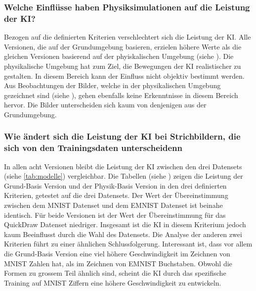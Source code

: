 \subsubsection*{Welche Einflüsse haben Physiksimulationen auf die Leistung der KI?}\label{subsub:d_frage_unter_4}
Bezogen auf die definierten Kriterien verschlechtert sich die Leistung der KI.
Alle Versionen, die auf der Grundumgebung basieren, erzielen höhere Werte als
die gleichen Versionen basierend auf der phyiskalischen Umgebung (siehe
). Die physikalische Umgebung hat zum Ziel, die
Bewegungen der KI realistischer zu gestalten. In diesem Bereich kann der
Einfluss nicht objektiv bestimmt werden. Aus Beobachtungen der Bilder, welche in
der physikalischen Umgebung gezeichnet sind (siehe ), gehen
ebenfalls keine Erkenntnisse in diesem Bereich hervor. Die Bilder unterscheiden
sich kaum von denjenigen aus der Grundumgebung.

\subsubsection*{Wie ändert sich die Leistung der KI bei Strichbildern, die sich
von den Trainingsdaten unterscheidenn}\label{subsub:d_frage_unter_5} In allen
acht Versionen bleibt die Leistung der KI zwischen den drei Datensets (siehe
\autoref{tab:modelle}) vergleichbar. Die Tabellen (siehe )
zeigen die Leistung der Grund-Basis Version und der Physik-Basis Version in den
drei definierten Kriterien, getestet auf die drei Datensets. Der Wert der
Übereinstimmung zwischen dem MNIST Datenset und dem EMNIST Datenset ist beinahe
identisch. Für beide Versionen ist der Wert der Übereinstimmung für das
QuickDraw Datenset niedriger. Insgesamt ist die KI in diesem Kriterium jedoch
kaum Beeinflusst durch die Wahl des Datensets. Die Analyse der anderen zwei
Kriterien führt zu einer ähnlichen Schlussfolgerung. Interessant ist, dass vor
allem die Grund-Basis Version eine viel höhere Geschwindigkeit im Zeichnen von
MNIST Zahlen hat, als im Zeichnen von EMNIST Buchstaben. Obwohl die Formen zu
grossem Teil ähnlich sind, scheint die KI durch das spezifische Training auf
MNIST Ziffern eine höhere Geschwindigkeit zu entwickeln.

